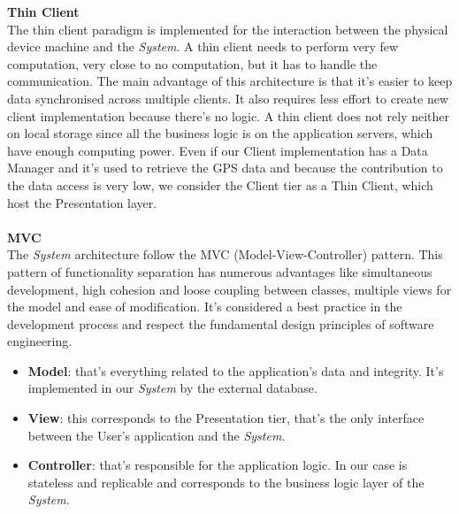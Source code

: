 \documentclass{article}
\begin{document}
	{\bf Thin Client} \\
	The thin client paradigm is implemented for the interaction between the physical device machine and the {\it System}. A thin client needs to perform very few computation, very close to no computation, but it has to handle the communication. The main advantage of this architecture is that it’s easier to keep data synchronised across multiple clients. It also requires less effort to create new client implementation because there's no logic. A thin client does not rely neither on local storage since all the business logic is on the application servers, which have enough computing power. Even if our Client implementation has a Data Manager and it's used to retrieve the GPS data and because the contribution to the data access is very low, we consider the Client tier as a Thin Client, which host the Presentation layer.
	\\ \\
	{\bf MVC} \\
	The {\it System} architecture follow the MVC (Model-View-Controller) pattern. This pattern of functionality separation has numerous advantages like simultaneous development, high cohesion and loose coupling between classes, multiple views for the model and ease of modification. It's considered a best practice in the development process and respect the fundamental design principles of software engineering.
	\begin{itemize}
		\item {\bf Model}: that's everything related to the application's data and integrity. It's implemented in our {\it System} by the external database.
		\item {\bf View}: this corresponds to the Presentation tier, that's the only interface between the User's application and the {\it System}.
		\item {\bf Controller}: that's responsible for the application logic. In our case is stateless and replicable and corresponds to the business logic layer of the {\it System}.
	\end{itemize}
		
\end{document}
